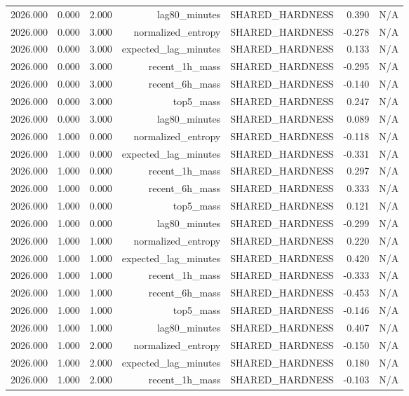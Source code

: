 \begin{table}[h!]
\begin{tabular}{lrrrrrr}
2026.000 & 0.000 & 2.000 & lag80\_minutes & SHARED\_HARDNESS & 0.390 & N/A \\
2026.000 & 0.000 & 3.000 & normalized\_entropy & SHARED\_HARDNESS & -0.278 & N/A \\
2026.000 & 0.000 & 3.000 & expected\_lag\_minutes & SHARED\_HARDNESS & 0.133 & N/A \\
2026.000 & 0.000 & 3.000 & recent\_1h\_mass & SHARED\_HARDNESS & -0.295 & N/A \\
2026.000 & 0.000 & 3.000 & recent\_6h\_mass & SHARED\_HARDNESS & -0.140 & N/A \\
2026.000 & 0.000 & 3.000 & top5\_mass & SHARED\_HARDNESS & 0.247 & N/A \\
2026.000 & 0.000 & 3.000 & lag80\_minutes & SHARED\_HARDNESS & 0.089 & N/A \\
2026.000 & 1.000 & 0.000 & normalized\_entropy & SHARED\_HARDNESS & -0.118 & N/A \\
2026.000 & 1.000 & 0.000 & expected\_lag\_minutes & SHARED\_HARDNESS & -0.331 & N/A \\
2026.000 & 1.000 & 0.000 & recent\_1h\_mass & SHARED\_HARDNESS & 0.297 & N/A \\
2026.000 & 1.000 & 0.000 & recent\_6h\_mass & SHARED\_HARDNESS & 0.333 & N/A \\
2026.000 & 1.000 & 0.000 & top5\_mass & SHARED\_HARDNESS & 0.121 & N/A \\
2026.000 & 1.000 & 0.000 & lag80\_minutes & SHARED\_HARDNESS & -0.299 & N/A \\
2026.000 & 1.000 & 1.000 & normalized\_entropy & SHARED\_HARDNESS & 0.220 & N/A \\
2026.000 & 1.000 & 1.000 & expected\_lag\_minutes & SHARED\_HARDNESS & 0.420 & N/A \\
2026.000 & 1.000 & 1.000 & recent\_1h\_mass & SHARED\_HARDNESS & -0.333 & N/A \\
2026.000 & 1.000 & 1.000 & recent\_6h\_mass & SHARED\_HARDNESS & -0.453 & N/A \\
2026.000 & 1.000 & 1.000 & top5\_mass & SHARED\_HARDNESS & -0.146 & N/A \\
2026.000 & 1.000 & 1.000 & lag80\_minutes & SHARED\_HARDNESS & 0.407 & N/A \\
2026.000 & 1.000 & 2.000 & normalized\_entropy & SHARED\_HARDNESS & -0.150 & N/A \\
2026.000 & 1.000 & 2.000 & expected\_lag\_minutes & SHARED\_HARDNESS & 0.180 & N/A \\
2026.000 & 1.000 & 2.000 & recent\_1h\_mass & SHARED\_HARDNESS & -0.103 & N/A \\

\end{tabular}
\end{table}
